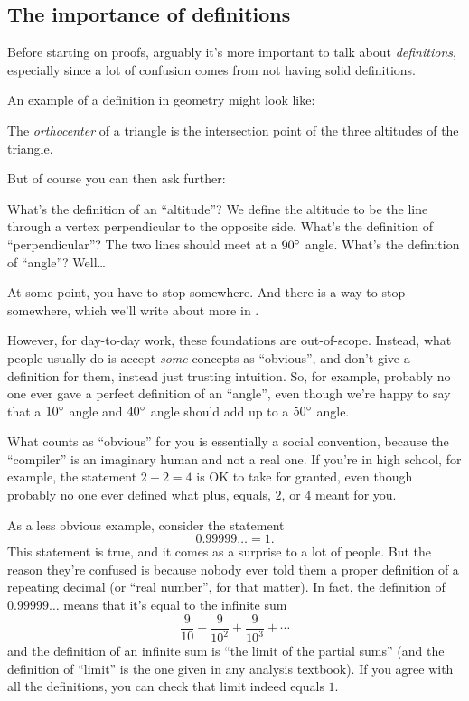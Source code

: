 \documentclass[11pt]{scrartcl}
\begin{document}
\subsection{The importance of definitions}
Before starting on proofs,
arguably it's more important to talk about \emph{definitions},
especially since a lot of confusion comes from not having solid definitions.

An example of a definition in geometry might look like:
\begin{definition}
  The \emph{orthocenter} of a triangle is the intersection
  point of the three altitudes of the triangle.
\end{definition}
But of course you can then ask further:
\begin{itemize}
  \ii What's the definition of an ``altitude''?
  We define the altitude to be the line
  through a vertex perpendicular to the opposite side.
  \ii What's the definition of ``perpendicular''?
  The two lines should meet at a $90^\circ$ angle.
  \ii What's the definition of ``angle''? Well\dots
\end{itemize}
At some point, you have to stop somewhere.
And there is a way to stop somewhere,
which we'll write about more in .

However, \alert{for day-to-day work, these foundations are out-of-scope}.
Instead, what people usually do is accept \emph{some} concepts as ``obvious'',
and don't give a definition for them, instead just trusting intuition.
So, for example, probably no one ever gave a perfect definition of an ``angle'',
even though we're happy to say that a $10^\circ$ angle and $40^\circ$ angle
should add up to a $50^\circ$ angle.

What counts as ``obvious'' for you is essentially a social convention,
because the ``compiler'' is an imaginary human and not a real one.
If you're in high school, for example, the statement $2+2=4$
is OK to take for granted, even though probably no one ever defined what
plus, equals, $2$, or $4$ meant for you.

As a less obvious example, consider the statement
\[ 0.99999\dotso = 1. \]
This statement is true, and it comes as a surprise to a lot of people.
But the reason they're confused is because nobody ever told them a
proper definition of a repeating decimal (or ``real number'', for that matter).
In fact, the definition of $0.99999\dots$ means
that it's equal to the infinite sum
\[ \frac{9}{10} + \frac{9}{10^2} + \frac{9}{10^3} + \dotsb \]
and the definition of an infinite sum is ``the limit of the partial sums''
(and the definition of ``limit'' is the one given in any analysis textbook).
If you agree with all the definitions, you can check that limit indeed equals $1$.
\end{document}
